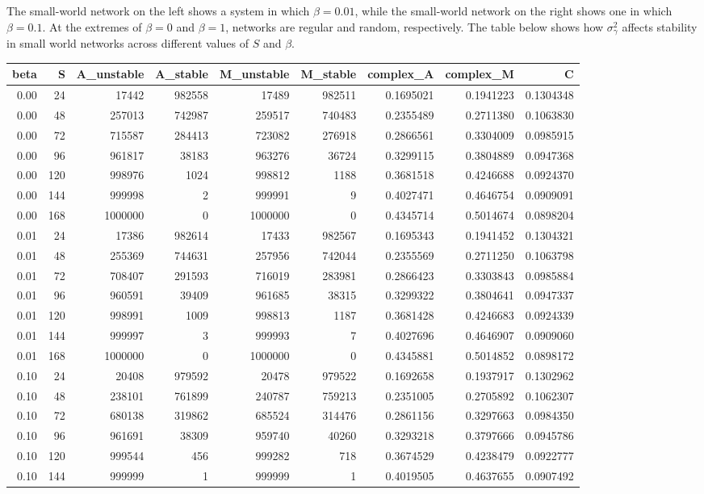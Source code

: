 \documentclass[]{article}
\begin{document}
\vspace{2mm}

The small-world network on the left shows a system in which
\(\beta = 0.01\), while the small-world network on the right shows one
in which \(\beta = 0.1\). At the extremes of \(\beta = 0\) and
\(\beta = 1\), networks are regular and random, respectively. The table
below shows how \(\sigma^{2}_\gamma\) affects stability in small world
networks across different values of \(S\) and \(\beta\).

\begin{longtable}[]{@{}rrrrrrrrr@{}}
\toprule
beta & S & A\_unstable & A\_stable & M\_unstable & M\_stable &
complex\_A & complex\_M & C\tabularnewline
\midrule
\endhead
0.00 & 24 & 17442 & 982558 & 17489 & 982511 & 0.1695021 & 0.1941223 &
0.1304348\tabularnewline
0.00 & 48 & 257013 & 742987 & 259517 & 740483 & 0.2355489 & 0.2711380 &
0.1063830\tabularnewline
0.00 & 72 & 715587 & 284413 & 723082 & 276918 & 0.2866561 & 0.3304009 &
0.0985915\tabularnewline
0.00 & 96 & 961817 & 38183 & 963276 & 36724 & 0.3299115 & 0.3804889 &
0.0947368\tabularnewline
0.00 & 120 & 998976 & 1024 & 998812 & 1188 & 0.3681518 & 0.4246688 &
0.0924370\tabularnewline
0.00 & 144 & 999998 & 2 & 999991 & 9 & 0.4027471 & 0.4646754 &
0.0909091\tabularnewline
0.00 & 168 & 1000000 & 0 & 1000000 & 0 & 0.4345714 & 0.5014674 &
0.0898204\tabularnewline
0.01 & 24 & 17386 & 982614 & 17433 & 982567 & 0.1695343 & 0.1941452 &
0.1304321\tabularnewline
0.01 & 48 & 255369 & 744631 & 257956 & 742044 & 0.2355569 & 0.2711250 &
0.1063798\tabularnewline
0.01 & 72 & 708407 & 291593 & 716019 & 283981 & 0.2866423 & 0.3303843 &
0.0985884\tabularnewline
0.01 & 96 & 960591 & 39409 & 961685 & 38315 & 0.3299322 & 0.3804641 &
0.0947337\tabularnewline
0.01 & 120 & 998991 & 1009 & 998813 & 1187 & 0.3681428 & 0.4246683 &
0.0924339\tabularnewline
0.01 & 144 & 999997 & 3 & 999993 & 7 & 0.4027696 & 0.4646907 &
0.0909060\tabularnewline
0.01 & 168 & 1000000 & 0 & 1000000 & 0 & 0.4345881 & 0.5014852 &
0.0898172\tabularnewline
0.10 & 24 & 20408 & 979592 & 20478 & 979522 & 0.1692658 & 0.1937917 &
0.1302962\tabularnewline
0.10 & 48 & 238101 & 761899 & 240787 & 759213 & 0.2351005 & 0.2705892 &
0.1062307\tabularnewline
0.10 & 72 & 680138 & 319862 & 685524 & 314476 & 0.2861156 & 0.3297663 &
0.0984350\tabularnewline
0.10 & 96 & 961691 & 38309 & 959740 & 40260 & 0.3293218 & 0.3797666 &
0.0945786\tabularnewline
0.10 & 120 & 999544 & 456 & 999282 & 718 & 0.3674529 & 0.4238479 &
0.0922777\tabularnewline
0.10 & 144 & 999999 & 1 & 999999 & 1 & 0.4019505 & 0.4637655 &
0.0907492\tabularnewline

\end{longtable}
\end{document}
